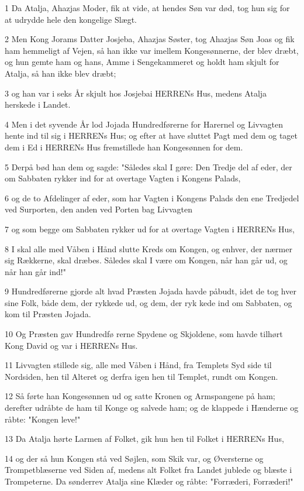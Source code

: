 \par 1 Da Atalja, Ahazjas Moder, fik at vide, at hendes Søn var død, tog hun sig for at udrydde hele den kongelige Slægt.
\par 2 Men Kong Jorams Datter Josjeba, Ahazjas Søster, tog Ahazjas Søn Joas og fik ham hemmeligt af Vejen, så han ikke var imellem Kongesønnerne, der blev dræbt, og hun gemte ham og hans, Amme i Sengekammeret og holdt ham skjult for Atalja, så han ikke blev dræbt;
\par 3 og han var i seks År skjult hos Josjebai HERRENs Hus, medens Atalja herskede i Landet.
\par 4 Men i det syvende År lod Jojada Hundredførerne for Harernel og Livvagten hente ind til sig i HERRENs Hus; og efter at have sluttet Pagt med dem og taget dem i Ed i HERRENs Hus fremstillede han Kongesønnen for dem.
\par 5 Derpå bød han dem og sagde: "Således skal I gøre: Den Tredje del af eder, der om Sabbaten rykker ind for at overtage Vagten i Kongens Palads,
\par 6 og de to Afdelinger af eder, som har Vagten i Kongens Palads den ene Tredjedel ved Surporten, den anden ved Porten bag Livvagten
\par 7 og som begge om Sabbaten rykker ud for at overtage Vagten i HERRENs Hus,
\par 8 I skal alle med Våben i Hånd slutte Kreds om Kongen, og enhver, der nærmer sig Rækkerne, skal dræbes. Således skal I være om Kongen, når han går ud, og når han går ind!"
\par 9 Hundredførerne gjorde alt hvad Præsten Jojada havde påbudt, idet de tog hver sine Folk, både dem, der rykkede ud, og dem, der ryk kede ind om Sabbaten, og kom til Præsten Jojada.
\par 10 Og Præsten gav Hundredfø rerne Spydene og Skjoldene, som havde tilhørt Kong David og var i HERRENs Hus.
\par 11 Livvagten stillede sig, alle med Våben i Hånd, fra Templets Syd side til Nordsiden, hen til Alteret og derfra igen hen til Templet, rundt om Kongen.
\par 12 Så førte han Kongesønnen ud og satte Kronen og Armspangene på ham; derefter udråbte de ham til Konge og salvede ham; og de klappede i Hænderne og råbte: "Kongen leve!"
\par 13 Da Atalja hørte Larmen af Folket, gik hun hen til Folket i HERRENs Hus,
\par 14 og der så hun Kongen stå ved Søjlen, som Skik var, og Øversterne og Trompetblæserne ved Siden af, medens alt Folket fra Landet jublede og blæste i Trompeterne. Da sønderrev Atalja sine Klæder og råbte: "Forræderi, Forræderi!"
